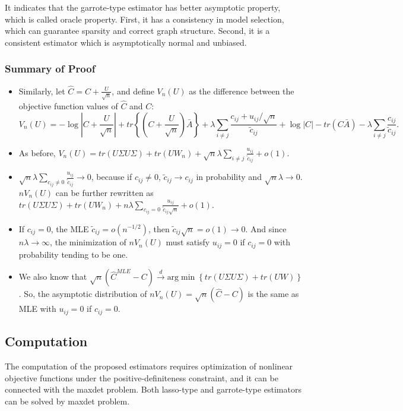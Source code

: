 It indicates that the garrote-type estimator has better asymptotic property, which is called oracle property. First, it has a consistency in model selection, which can guarantee sparsity and correct graph structure. Second, it is a consistent estimator which is asymptotically normal and unbiased. 
\subsubsection*{Summary of Proof}
\begin{itemize}
\item Similarly, let $\hat{C}=C+\frac{U}{\sqrt{n}}$, and define $V_n(U)$ as the difference between the objective function values of $\hat{C}$ and $C$: 
\[V_n(U)=-\log\left\vert C+\frac{U}{\sqrt{n}}\right\vert +tr\left\lbrace \left( C+\frac{U}{\sqrt{n}}\right) \bar{A}\right\rbrace +\lambda \sum_{i\neq j} \frac{c_{ij}+u_{ij}/\sqrt{n}}{\tilde{c}_{ij}} +\log|C|-tr(C\bar{A})-\lambda \sum_{i\neq j}\frac{c_{ij}}{\tilde{c}_{ij}} \mbox{.}\]
\item As before, $V_n(U)=tr(U\Sigma U\Sigma )+tr(UW_n)+\sqrt{n} \lambda \sum_{i\neq j}\frac{u_{ij}}{\tilde{c}_{ij}} +o(1)$.
\item $\sqrt{n} \lambda \sum_{c_{ij}\neq 0}\frac{u_{ij}}{\tilde{c}_{ij}} \rightarrow 0$, because if $c_{ij}\neq 0$, $\tilde{c}_{ij} \rightarrow c_{ij}$ in probability and $\sqrt{n} \lambda \rightarrow 0$. $nV_n(U)$ can be further rewritten as $tr(U\Sigma U\Sigma )+tr(UW_n)+n\lambda \sum_{c_{ij}=0}\frac{u_{ij}}{\tilde{c}_{ij} \sqrt{n}} +o(1)$. 
\item If $c_{ij}=0$, the MLE $\tilde{c}_{ij}=o(n^{-1/2})$, then $\tilde{c}_{ij} \sqrt{n}=o(1)\rightarrow 0$. And since $n\lambda \rightarrow \infty$, the minimization of $nV_n(U)$ must satisfy $u_{ij}=0$ if $c_{ij}=0$ with probability tending to be one. 
\item We also know that $\sqrt{n} \left( \hat{C}^{MLE} - C\right) \stackrel{d}{\rightarrow} \mbox{arg} \min \left\lbrace tr(U\Sigma U\Sigma)+tr(UW)\right\rbrace$. So, the asymptotic distribution of $nV_n(U)=\sqrt{n} \left( \hat{C} - C\right)$ is the same as MLE with $u_{ij}=0$ if $c_{ij}=0$.
\end{itemize}

\subsection*{Computation}
The computation of the proposed estimators requires optimization of nonlinear objective functions under the positive-definiteness constraint, and it can be connected with the maxdet problem. Both lasso-type and garrote-type estimators can be solved by maxdet problem. 

